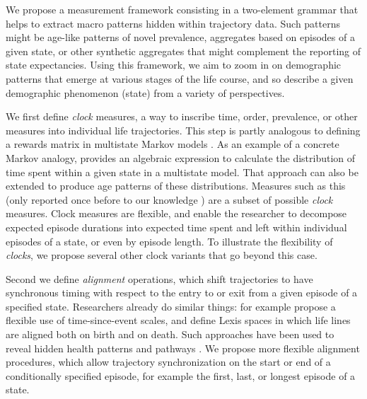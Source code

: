 \documentclass[a4paper,left=1.25cm,right=1.25cm,top=1.25cm,bottom=1.25cm]{article}
\begin{document}
% 
% 
% 
% 
We propose a measurement framework consisting in a two-element grammar that helps to extract macro patterns hidden within trajectory data. Such patterns might be age-like patterns of novel prevalence, aggregates based on episodes of a given state, or other synthetic aggregates that might complement the reporting of state expectancies. Using this framework, we aim to zoom in on demographic patterns that emerge at various stages of the life course, and so describe a given demographic phenomenon (state) from a variety of perspectives. 

We first define \emph{clock} measures, a way to inscribe time, order, prevalence, or other measures into individual life trajectories. This step is partly analogous to defining a rewards matrix in multistate Markov models \citep[see e.g.][]{caswell2018matrix}. As an example of a concrete Markov analogy, \citet{dudel2018expanding} provides an algebraic expression to calculate the distribution of time spent within a given state in a multistate model. That approach can also be extended to produce age patterns of these distributions. Measures such as this (only reported once before to our knowledge \citep{laditka1998new}) are a subset of possible \emph{clock} measures. Clock measures are flexible, and enable the researcher to decompose expected episode durations into expected time spent and left within individual episodes of a state, or even by episode length. To illustrate the flexibility of \emph{clocks}, we propose several other clock variants that go beyond this case.

Second we define \emph{alignment} operations, which shift trajectories to have synchronous timing with respect to the entry to or exit from a given episode of a specified state. Researchers already do similar things: for example \citet{iacobelli2013multiple} propose a flexible use of time-since-event scales, and \citet{riffe2017unified} define Lexis spaces in which life lines are aligned both on birth and on death. Such approaches have been used to reveal hidden health patterns \citep{riffe2016time} and pathways \citep{potente2018disability, raab2018pathways}. We propose more flexible alignment procedures, which allow trajectory synchronization on the start or end of a conditionally specified episode, for example the first, last, or longest episode of a state.
\end{document}
